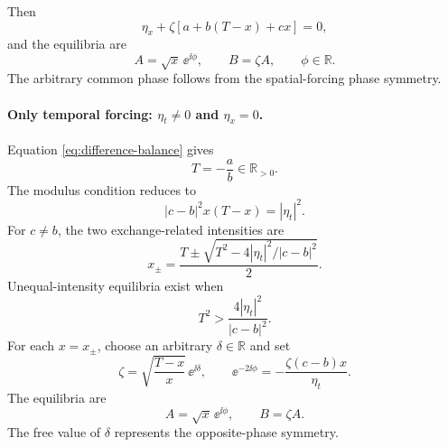 Then
\begin{equation}
 \eta_x+\zeta\left[a+b(T-x)+cx\right]=0,
 \label{eq:spatial-ratio}
\end{equation}
and the equilibria are
\begin{equation}
 A=\sqrt{x}\,\ee^{\ii\phi},
 \qquad
 B=\zeta A,
 \qquad
 \phi\in\mathbb R.
 \label{eq:spatial-equilibria}
\end{equation}
The arbitrary common phase follows from the spatial-forcing phase symmetry.

\paragraph{Only temporal forcing: $\eta_t\neq0$ and $\eta_x=0$.}
Equation \eqref{eq:difference-balance} gives
\begin{equation}
 T=-\frac ab\in\mathbb R_{>0}.
 \label{eq:temporal-T}
\end{equation}
The modulus condition reduces to
\begin{equation}
 |c-b|^2x(T-x)=|\eta_t|^2.
 \label{eq:temporal-x-balance}
\end{equation}
For $c\neq b$, the two exchange-related intensities are
\begin{equation}
 x_\pm=
 \frac{T\pm\sqrt{T^2-4|\eta_t|^2/|c-b|^2}}{2}.
 \label{eq:temporal-x-roots}
\end{equation}
Unequal-intensity equilibria exist when
\begin{equation}
 T^2>\frac{4|\eta_t|^2}{|c-b|^2}.
 \label{eq:temporal-existence}
\end{equation}
For each $x=x_\pm$, choose an arbitrary $\delta\in\mathbb R$ and set
\begin{equation}
 \zeta=\sqrt{\frac{T-x}{x}}\,\ee^{\ii\delta},
 \qquad
 \ee^{-2\ii\phi}=-\frac{\zeta(c-b)x}{\eta_t}.
 \label{eq:temporal-phase}
\end{equation}
The equilibria are
\begin{equation}
 A=\sqrt{x}\,\ee^{\ii\phi},
 \qquad
 B=\zeta A.
 \label{eq:temporal-equilibria}
\end{equation}
The free value of $\delta$ represents the opposite-phase symmetry.

